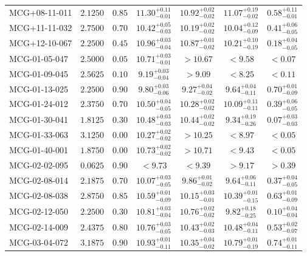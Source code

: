 \documentclass[onecolumn]{mn2e}
\begin{document}
{\begin{center}
\begin{longtable}{lcccccc}
MCG+08-11-011 & $2.1250$ & $0.85$ & $11.30_{-0.01}^{+0.11}$ & $10.92_{-0.02}^{+0.02}$ & $11.07_{-0.02}^{+0.19}$ &$0.58_{-0.01}^{+0.11}$ \\
MCG+11-11-032 & $2.7500$ & $0.70$ & $10.42_{-0.03}^{+0.05}$ & $10.19_{-0.02}^{+0.02}$ & $10.04_{-0.09}^{+0.12}$ &$0.41_{-0.05}^{+0.06}$ \\
MCG+12-10-067 & $2.2500$ & $0.45$ & $10.96_{-0.04}^{+0.03}$ & $10.87_{-0.02}^{+0.01}$ & $10.21_{-0.19}^{+0.10}$ &$0.18_{-0.05}^{+0.04}$ \\
MCG-01-05-047 & $2.5000$ & $0.05$ & $10.71_{-0.01}^{+0.03}$ & $>10.67$ & $<9.58$ &$<0.07$ \\
MCG-01-09-045 & $2.5625$ & $0.10$ & $9.19_{-0.04}^{+0.03}$ & $>9.09$ & $<8.25$ &$<0.11$ \\
MCG-01-13-025 & $2.2500$ & $0.90$ & $9.80_{-0.06}^{+0.03}$ & $9.27_{-0.02}^{+0.04}$ & $9.64_{-0.11}^{+0.04}$ &$0.70_{-0.09}^{+0.01}$ \\
MCG-01-24-012 & $2.3750$ & $0.70$ & $10.50_{-0.05}^{+0.04}$ & $10.28_{-0.02}^{+0.02}$ & $10.09_{-0.11}^{+0.11}$ &$0.39_{-0.05}^{+0.06}$ \\
MCG-01-30-041 & $1.8125$ & $0.30$ & $10.48_{-0.03}^{+0.03}$ & $10.44_{-0.02}^{+0.02}$ & $9.34_{-0.26}^{+0.19}$ &$0.07_{-0.03}^{+0.03}$ \\
MCG-01-33-063 & $3.1250$ & $0.00$ & $10.27_{-0.02}^{+0.02}$ & $>10.25$ & $<8.97$ &$<0.05$ \\
MCG-01-40-001 & $1.8750$ & $0.00$ & $10.73_{-0.02}^{+0.02}$ & $>10.71$ & $<9.43$ &$<0.05$ \\
MCG-02-02-095 & $0.0625$ & $0.90$ & $<9.73$ & $<9.39$ & $>9.17$ &$>0.39$ \\
MCG-02-08-014 & $2.1875$ & $0.70$ & $10.07_{-0.05}^{+0.03}$ & $9.86_{-0.02}^{+0.01}$ & $9.64_{-0.11}^{+0.06}$ &$0.37_{-0.05}^{+0.04}$ \\
MCG-02-08-038 & $2.8750$ & $0.85$ & $10.59_{-0.09}^{+0.01}$ & $10.15_{-0.01}^{+0.03}$ & $10.39_{-0.15}^{+0.01}$ &$0.63_{-0.09}^{+0.01}$ \\
MCG-02-12-050 & $2.2500$ & $0.30$ & $10.81_{-0.04}^{+0.03}$ & $10.76_{-0.02}^{+0.02}$ & $9.82_{-0.25}^{+0.18}$ &$0.10_{-0.04}^{+0.04}$ \\
MCG-02-14-009 & $2.4375$ & $0.80$ & $10.76_{-0.05}^{+0.03}$ & $10.43_{-0.03}^{+0.02}$ & $10.48_{-0.11}^{+0.04}$ &$0.53_{-0.07}^{+0.02}$ \\
MCG-03-04-072 & $3.1875$ & $0.90$ & $10.93_{-0.11}^{+0.01}$ & $10.35_{-0.02}^{+0.04}$ & $10.79_{-0.19}^{+0.01}$ &$0.74_{-0.11}^{+0.01}$ \\

\end{longtable}
\end{center}}
\end{document}
